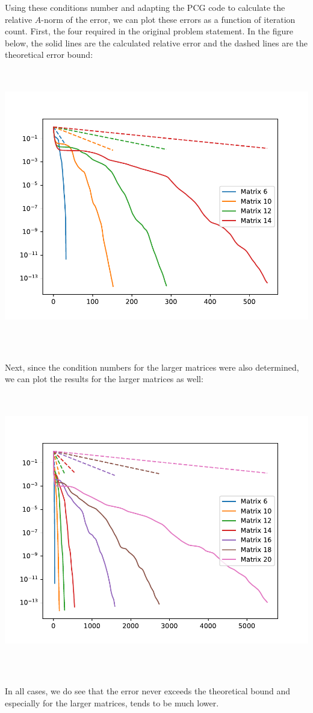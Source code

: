 \documentclass[oneside,final]{amsart}  %
\begin{document}
Using these conditions number and adapting the PCG code to calculate the relative $A$-norm of the
error, we can plot these errors as a function of iteration count.  First, the four required in the
original problem statement.  In the figure below, the solid lines are the calculated relative error
and the dashed lines are the theoretical error bound:\\
\includegraphics[height=5in]{Problem2-ErrorPlot-First4.pdf}

Next, since the condition numbers for the larger matrices were also determined, we can plot the
results for the larger matrices as well: \\
\includegraphics[height=5in]{Problem2-ErrorPlot-all.pdf}

In all cases, we do see that the error never exceeds the theoretical bound and especially for the
larger matrices, tends to be much lower.
\end{document}
